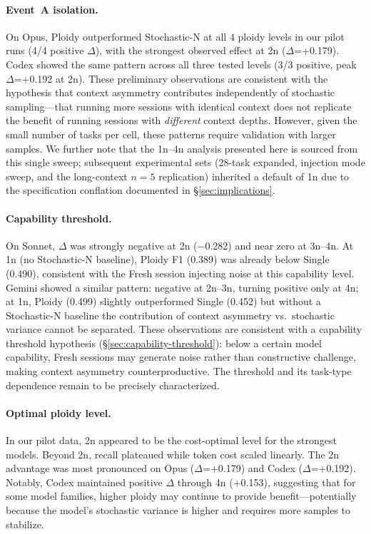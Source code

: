 \documentclass[11pt]{article}
\begin{document}
\paragraph{Event~A isolation.} On Opus, Ploidy outperformed Stochastic-N at all 4 ploidy levels in our pilot runs (4/4 positive $\Delta$), with the strongest observed effect at 2n ($\Delta$=+0.179). Codex showed the same pattern across all three tested levels (3/3 positive, peak $\Delta$=+0.192 at 2n). These preliminary observations are consistent with the hypothesis that context asymmetry contributes independently of stochastic sampling---that running more sessions with identical context does not replicate the benefit of running sessions with \emph{different} context depths. However, given the small number of tasks per cell, these patterns require validation with larger samples. We further note that the 1n--4n analysis presented here is sourced from this single sweep; subsequent experimental sets (28-task expanded, injection mode sweep, and the long-context $n{=}5$ replication) inherited a default of 1n due to the specification conflation documented in \S\ref{sec:implications}.

\paragraph{Capability threshold.} On Sonnet, $\Delta$ was strongly negative at 2n ($-$0.282) and near zero at 3n--4n. At 1n (no Stochastic-N baseline), Ploidy F1 (0.389) was already below Single (0.490), consistent with the Fresh session injecting noise at this capability level. Gemini showed a similar pattern: negative at 2n--3n, turning positive only at 4n; at 1n, Ploidy (0.499) slightly outperformed Single (0.452) but without a Stochastic-N baseline the contribution of context asymmetry vs.\ stochastic variance cannot be separated. These observations are consistent with a capability threshold hypothesis (\S\ref{sec:capability-threshold}): below a certain model capability, Fresh sessions may generate noise rather than constructive challenge, making context asymmetry counterproductive. The threshold and its task-type dependence remain to be precisely characterized.

\paragraph{Optimal ploidy level.} In our pilot data, 2n appeared to be the cost-optimal level for the strongest models. Beyond 2n, recall plateaued while token cost scaled linearly. The 2n advantage was most pronounced on Opus ($\Delta$=+0.179) and Codex ($\Delta$=+0.192). Notably, Codex maintained positive $\Delta$ through 4n (+0.153), suggesting that for some model families, higher ploidy may continue to provide benefit---potentially because the model's stochastic variance is higher and requires more samples to stabilize.
\end{document}
